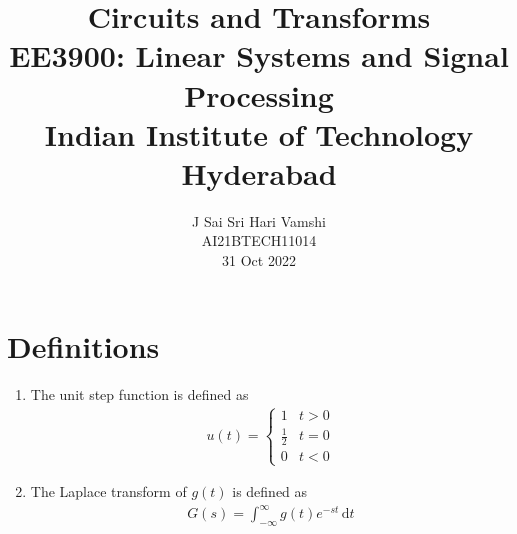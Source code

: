 \documentclass[journal,12pt,twocolumn]{IEEEtran}
\title{Circuits and Transforms \\ \Large EE3900: Linear Systems and Signal Processing \\ \large Indian Institute of Technology Hyderabad}
\author{J Sai Sri Hari Vamshi \\ \normalsize AI21BTECH11014 \\ \vspace*{20pt} \normalsize 31 Oct 2022}
\providecommand{\der}[1]{\mathrm{d} #1}
\numberwithin{equation}{section}
\numberwithin{figure}{section}
\renewcommand\thesection{\arabic{section}}
\begin{document}
	
	\maketitle
	
	\section{Definitions}
	\begin{enumerate}[label=\thesection.\arabic*,ref=\thesection.\theenumi]
	
		\item The unit step function is defined as
			\begin{align}
				u(t) =
				\begin{cases}
					1 & t > 0 \\
					\frac{1}{2} & t = 0 \\
					0 & t < 0
				\end{cases}
			\end{align}
		
		\item The Laplace transform of $g(t)$ is defined as 
			\begin{align}
				G(s) = \int_{-\infty}^{\infty} g(t) e^{-st}\, \der{t}
			\end{align}
	
	\end{enumerate}
	
\end{document}
